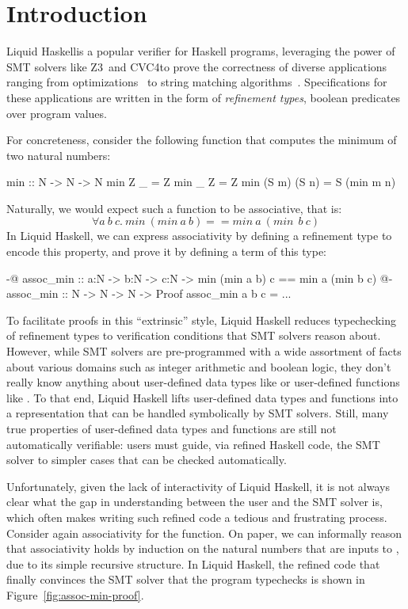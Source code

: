 \section{Introduction}

%
Liquid Haskell\cn is a popular verifier for Haskell programs,
leveraging the power of SMT solvers like Z3~\cn and CVC4\cn to prove
the correctness of diverse applications ranging from
optimizations~\cite{TPE2018} to string matching
algorithms~\cite{TaleOfTwoProvers}. Specifications for these
applications are written in the form of {\em refinement types}\cn,
boolean predicates over program values.

For concreteness, consider the following  function that
computes the minimum of two natural numbers:
\begin{code}
  min :: N -> N -> N 
  min Z _ = Z
  min _ Z = Z
  min (S m) (S n) = S (min m n)
\end{code}

\newcommand{\imin}{\textit{min}~}
Naturally, we would expect such a function to be associative, that is:
$$ \forall a ~ b ~ c. ~ \imin (\imin a~b) == \imin a~(\imin~b~c) $$
%
In Liquid Haskell, we can express associativity by defining a
refinement type to encode this property, and prove it by defining
a term of this type:
\begin{code}
  {-@ assoc_min :: a:N -> b:N -> c:N ->
        {min (min a b) c == min a (min b c)} @-}
  assoc_min :: N -> N -> N -> Proof
  assoc_min a b c = ...
\end{code}

To facilitate proofs in this ``extrinsic'' style, Liquid Haskell
reduces typechecking of refinement types to verification conditions
that SMT solvers reason about. However, while SMT solvers are
pre-programmed with a wide assortment of facts about various domains
such as integer arithmetic and boolean logic, they don't really know
anything about user-defined data types like  or user-defined
functions like . To that end, Liquid Haskell lifts
user-defined data types and functions into a representation that can
be handled symbolically by SMT solvers\cn. Still, many true properties
of user-defined data types and functions are still not automatically
verifiable: users must guide, via refined Haskell code, the SMT solver
to simpler cases that can be checked automatically.

Unfortunately, given the lack of interactivity of Liquid Haskell, it
is not always clear what the gap in understanding between the user and
the SMT solver is, which often makes writing such refined code a
tedious and frustrating process. Consider again associativity for the
 function. On paper, we can informally reason that
associativity holds by induction on the natural numbers that are inputs
to , due to its simple recursive structure. In Liquid Haskell,
the refined code that finally convinces the SMT solver that the
program typechecks is shown in Figure~\ref{fig:assoc-min-proof}.


